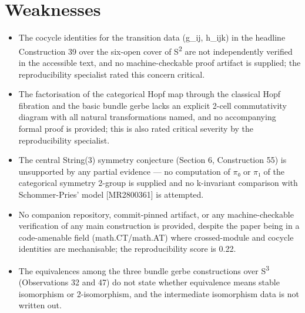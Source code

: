 \documentclass[11pt]{article}
\begin{document}
\section*{Weaknesses}
\begin{itemize}[leftmargin=*]
  \item The cocycle identities for the transition data (g\_ij, h\_ijk) in the headline Construction 39 over the six-open cover of S\textsuperscript{2} are not independently verified in the accessible text, and no machine-checkable proof artifact is supplied; the reproducibility specialist rated this concern critical.
  \item The factorisation of the categorical Hopf map through the classical Hopf fibration and the basic bundle gerbe lacks an explicit 2-cell commutativity diagram with all natural transformations named, and no accompanying formal proof is provided; this is also rated critical severity by the reproducibility specialist.
  \item The central String(3) symmetry conjecture (Section 6, Construction 55) is unsupported by any partial evidence --- no computation of \ensuremath{\pi}₀ or \ensuremath{\pi}₁ of the categorical symmetry 2-group is supplied and no k-invariant comparison with Schommer-Pries' model [MR2800361] is attempted.
  \item No companion repository, commit-pinned artifact, or any machine-checkable verification of any main construction is provided, despite the paper being in a code-amenable field (math.CT/math.AT) where crossed-module and cocycle identities are mechanisable; the reproducibility score is 0.22.
  \item The equivalences among the three bundle gerbe constructions over S\textsuperscript{3} (Observations 32 and 47) do not state whether equivalence means stable isomorphism or 2-isomorphism, and the intermediate isomorphism data is not written out.
\end{itemize}
\end{document}
